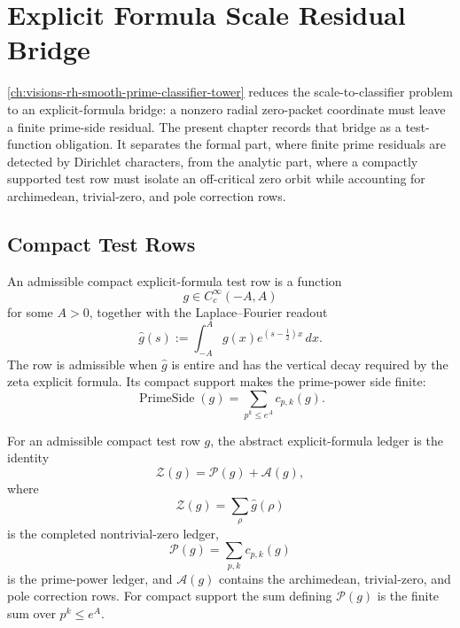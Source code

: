\chapter{Explicit Formula Scale Residual Bridge}
\label{ch:visions-rh-explicit-formula-scale-residual-bridge}

\autoref{ch:visions-rh-smooth-prime-classifier-tower} reduces the
scale-to-classifier problem to an explicit-formula bridge: a nonzero
radial zero-packet coordinate must leave a finite prime-side residual.
The present chapter records that bridge as a test-function obligation.
It separates the formal part, where finite prime residuals are detected
by Dirichlet characters, from the analytic part, where a compactly
supported test row must isolate an off-critical zero orbit while
accounting for archimedean, trivial-zero, and pole correction rows.

\section{Compact Test Rows}
\label{sec:rh-explicit-formula-compact-test-rows}

\begin{definition}
\label{def:rh-compact-explicit-formula-test-row}
An admissible compact explicit-formula test row is a function
$$
g\in C_c^\infty(-A,A)
$$
for some $A>0$, together with the Laplace--Fourier readout
$$
\widehat g(s)
:=
\int_{-A}^{A}g(x)e^{(s-\frac12)x}\,dx.
$$
The row is admissible when $\widehat g$ is entire and has the vertical
decay required by the zeta explicit formula.  Its compact support makes
the prime-power side finite:
$$
\operatorname{PrimeSide}(g)
=
\sum_{p^k\le e^A}c_{p,k}(g).
$$
\end{definition}

\begin{definition}
\label{def:rh-abstract-explicit-formula-ledger}
For an admissible compact test row $g$, the abstract explicit-formula
ledger is the identity
$$
\mathcal Z(g)=\mathcal P(g)+\mathcal A(g),
$$
where
$$
\mathcal Z(g)=\sum_{\rho}\widehat g(\rho)
$$
is the completed nontrivial-zero ledger,
$$
\mathcal P(g)=\sum_{p,k}c_{p,k}(g)
$$
is the prime-power ledger, and $\mathcal A(g)$ contains the
archimedean, trivial-zero, and pole correction rows.  For compact
support the sum defining $\mathcal P(g)$ is the finite sum over
$p^k\le e^A$.
\end{definition}

